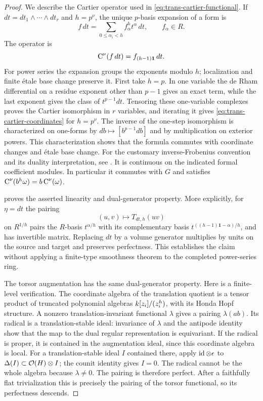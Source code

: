 \begin{proof}
We describe the Cartier operator used in
\cref{eq:trans-cartier-functional}.  If
$dt=dt_1\wedge\cdots\wedge dt_r$ and $h=p^\nu$, the unique $p$-basis
expansion of a form is
\[
 f\,dt=\sum_{0\leq\alpha_i<h} f_\alpha^h t^\alpha\,dt,
 \qquad f_\alpha\in R.
\]
The operator is
\begin{equation}
 \operatorname{C}^\nu(f\,dt)=f_{(h-1)\mathbf1}\,dt.
 \label{eq:trans-cartier-coordinates}
\end{equation}
For power series the expansion groups the exponents modulo $h$;
localization and finite \'{e}tale base change preserve it.  First take
$h=p$.  In one variable the de Rham differential on a residue exponent
other than $p-1$ gives an exact term, while the last exponent gives the
class of $t^{p-1}dt$.  Tensoring these one-variable complexes proves
the Cartier isomorphism in $r$ variables, and iterating it gives
\cref{eq:trans-cartier-coordinates} for $h=p^\nu$.  The inverse of the
one-step isomorphism is
characterized on one-forms by $db\mapsto[b^{p-1}db]$ and by
multiplication on exterior powers.  This characterization shows that
the formula commutes with coordinate changes and \'{e}tale base change.
For the customary inverse-Frobenius convention and its duality
interpretation, see \citet[Definition~2.1 and Example~2.23]{blickleBockle2011}.
It is continuous on the indicated formal coefficient modules.  In
particular it commutes with $G$ and satisfies
$\operatorname{C}^\nu(b^h\omega)=b\operatorname{C}^\nu(\omega)$.

 proves the asserted
linearity and dual-generator property.  More explicitly, for
$\eta=dt$ the pairing
\[
 (u,v)\longmapsto T_{dt,h}(uv)
\]
on $R^{1/h}$ pairs the $R$-basis $t^{\alpha/h}$ with its
complementary basis $t^{((h-1)\mathbf1-\alpha)/h}$, and has invertible
matrix.  Replacing $dt$ by a volume generator multiplies by units on
the source and target and preserves perfectness.  This establishes
the claim without applying a finite-type smoothness theorem to the
completed power-series ring.

The torsor augmentation has the same dual-generator property.  Here
is a finite-level verification.  The coordinate algebra of the
translation quotient is a tensor product of truncated polynomial
algebras $k[z_i]/(z_i^h)$, with its Honda Hopf structure.  A nonzero
translation-invariant functional $\lambda$ gives a pairing
$\lambda(ab)$.  Its radical is a translation-stable ideal: invariance
of $\lambda$ and the antipode identity show that the map to the dual
regular representation is equivariant.  If the radical is proper,
it is contained in the augmentation ideal, since this coordinate
algebra is local.  For a translation-stable ideal $I$ contained there,
apply $\operatorname{id}\otimes\epsilon$ to $\Delta(I)\subset\mathcal O(H)\otimes I$;
the counit identity gives $I=0$.  The radical cannot be the whole
algebra because $\lambda\ne0$.  The pairing is therefore perfect.
After a faithfully flat trivialization this is precisely the pairing
of the torsor functional, so its perfectness descends.


\end{proof}
